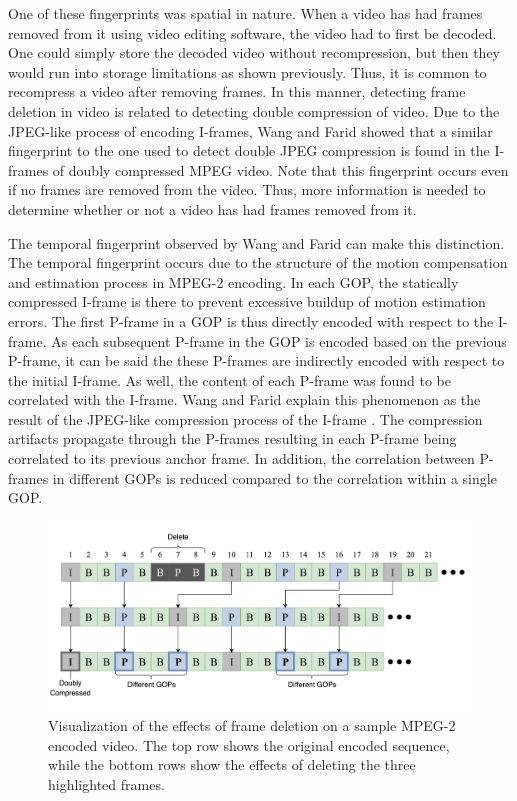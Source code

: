 One of these fingerprints was spatial in nature. When a video has had frames removed from it using video editing software, the video had to first be decoded. One could simply store the decoded video without recompression, but then they would run into storage limitations as shown previously. Thus, it is common to recompress a video after removing frames. In this manner, detecting frame deletion in video is related to detecting double compression of video. Due to the JPEG-like process of encoding I-frames, Wang and Farid showed that a similar fingerprint to the one used to detect double JPEG compression \cite{doubleJPEG} \cite{doubleJPEG2} is found in the I-frames of doubly compressed MPEG video. Note that this fingerprint occurs even if no frames are removed from the video. Thus, more information is needed to determine whether or not a video has had frames removed from it.

The temporal fingerprint observed by Wang and Farid can make this distinction. The temporal fingerprint occurs due to the structure of the motion compensation and estimation process in MPEG-2 encoding. In each GOP, the statically compressed I-frame is there to prevent excessive buildup of motion estimation errors. The first P-frame in a GOP is thus directly encoded with respect to the I-frame. As each subsequent P-frame in the GOP is encoded based on the previous P-frame, it can be said the these P-frames are indirectly encoded with respect to the initial I-frame. As well, the content of each P-frame was found to be correlated with the I-frame. Wang and Farid explain this phenomenon as the result of the JPEG-like compression process of the I-frame \cite{wang}. The compression artifacts propagate through the P-frames resulting in each P-frame being correlated to its previous anchor frame. In addition, the correlation between P-frames in different GOPs is reduced compared to the correlation within a single GOP.

\begin{figure}[htbp]
\centerline{\includegraphics[width=0.9\linewidth]{Background/frame_deletion.png}}
\caption[Visualization of the Effects of Frame Deletion on a Sample MPEG-2 Encoded Video.]{Visualization of the effects of frame deletion on a sample MPEG-2 encoded video. The top row shows the original encoded sequence, while the bottom rows show the effects of deleting the three highlighted frames.}
\label{framedeletion}
\end{figure}

